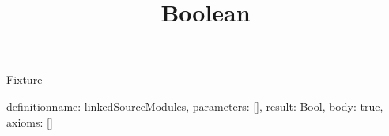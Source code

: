 \begin{lexlean}{Fixture}
\title{Boolean}
\begin{semanticmodule}
definition{name: linkedSourceModules, parameters: [], result: Bool, body: true, axioms: []}
\end{semanticmodule}
\end{lexlean}
